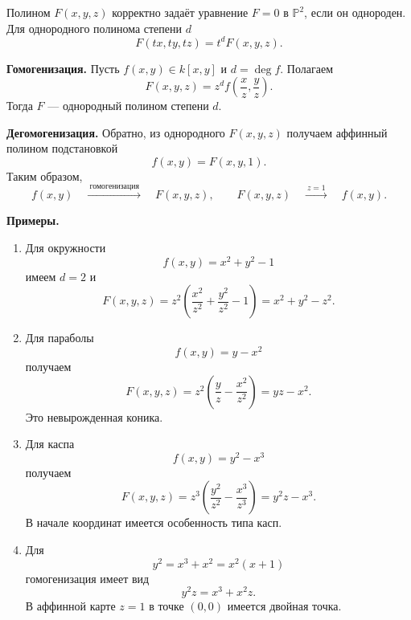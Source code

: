 \documentclass[12pt,a4paper]{article}
\newcommand{\PP}{\mathbb P}
\begin{document}
Полином $F(x,y,z)$ корректно задаёт уравнение $F=0$ в $\PP^2$, если он однороден. Для однородного полинома степени $d$
\[
F(tx,ty,tz)=t^dF(x,y,z).
\]

\textbf{Гомогенизация.}
Пусть $f(x,y)\in k[x,y]$ и $d=\deg f$. Полагаем
\[
F(x,y,z)=z^d f\!\left(\frac{x}{z},\frac{y}{z}\right).
\]
Тогда $F$ --- однородный полином степени $d$.

\textbf{Дегомогенизация.}
Обратно, из однородного $F(x,y,z)$ получаем аффинный полином подстановкой
\[
f(x,y)=F(x,y,1).
\]
Таким образом,
\[
f(x,y)\quad\xrightarrow{\ \text{гомогенизация}\ }\quad F(x,y,z),
\qquad
F(x,y,z)\quad\xrightarrow{\ z=1\ }\quad f(x,y).
\]

\textbf{Примеры.}
\begin{enumerate}[label=\arabic*)]
\item Для окружности
\[
f(x,y)=x^2+y^2-1
\]
имеем $d=2$ и
\[
F(x,y,z)=z^2\left(\frac{x^2}{z^2}+\frac{y^2}{z^2}-1\right)
=x^2+y^2-z^2.
\]

\item Для параболы
\[
f(x,y)=y-x^2
\]
получаем
\[
F(x,y,z)=z^2\left(\frac{y}{z}-\frac{x^2}{z^2}\right)=yz-x^2.
\]
Это невырожденная коника.

\item Для каспа
\[
f(x,y)=y^2-x^3
\]
получаем
\[
F(x,y,z)=z^3\left(\frac{y^2}{z^2}-\frac{x^3}{z^3}\right)=y^2z-x^3.
\]
В начале координат имеется особенность типа касп.

\item Для
\[
y^2=x^3+x^2=x^2(x+1)
\]
гомогенизация имеет вид
\[
y^2z=x^3+x^2z.
\]
В аффинной карте $z=1$ в точке $(0,0)$ имеется двойная точка.
\end{enumerate}
\end{document}
